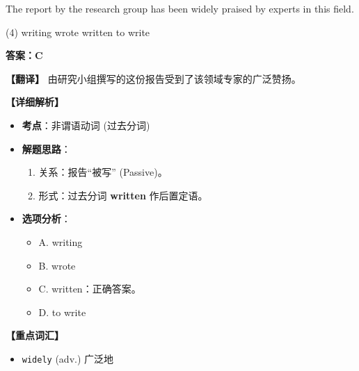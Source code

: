 \documentclass[11pt, a4paper]{article}
\newcommand{\analysis}[4]{
    \begin{solutionbox}
        \textbf{答案：#1}
        
        \textbf{【翻译】} #2
        
        \textbf{【详细解析】}
        #3
        
        \textbf{【重点词汇】}
        #4
    \end{solutionbox}
}
\newcommand{\blank}{\underline{\hspace{1.5cm}}}
\begin{document}
\begin{questions}
    \item The report \blank by the research group has been widely praised by experts in this field.
    \begin{tasks}(4)
        \task writing \task wrote \task written \task to write
    \end{tasks}
    \analysis{C}{由研究小组撰写的这份报告受到了该领域专家的广泛赞扬。}{
        \begin{itemize}
            \item \textbf{考点}：非谓语动词 (过去分词)
            \item \textbf{解题思路}：
                \begin{enumerate}
                    \item 关系：报告“被写” (Passive)。
                    \item 形式：过去分词 \textbf{written} 作后置定语。
                \end{enumerate}
            \item \textbf{选项分析}：
                \begin{itemize}
                    \item A. writing
                    \item B. wrote
                    \item C. written：正确答案。
                    \item D. to write
                \end{itemize}
        \end{itemize}
    }{
        \begin{itemize}
            \item \texttt{widely} (adv.) 广泛地
        \end{itemize}
    }


\end{questions}
\end{document}

